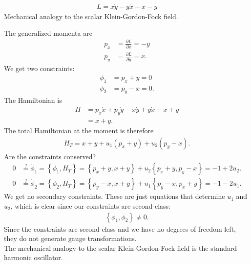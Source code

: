 \begin{exercise}
\begin{align*}
L = x \dot{y} - y \dot{x} - x - y
\end{align*}
Mechanical analogy to the scalar Klein-Gordon-Fock field.
\end{exercise}
\begin{solution}
The generalized momenta are
\begin{align*}
p_x &= \frac{\partial L}{\partial \dot{x}} = -y \\
p_y &= \frac{\partial L}{\partial \dot{y}} = x.
\end{align*}
We get two constraints:
\begin{align*}
\phi_1 &= p_x + y = 0 \\
\phi_2 &= p_y - x = 0.
\end{align*}
The Hamiltonian is
\begin{align*}
H &= p_x \dot{x} + p_y \dot{y} - x \dot{y} + y \dot{x} + x + y \\
&= x + y.
\end{align*}
The total Hamiltonian at the moment is therefore
\begin{align*}
H_T = x + y + u_1 (p_x + y) + u_2 (p_y - x).
\end{align*}
Are the constraints conserved?
\begin{align*}
0 &\overset{?}{=} \dot{\phi}_1 = \left \{ \phi_1,H_T \right \} = \left \{ p_x + y,x + y \right \} + u_2 \left \{ p_x + y,p_y - x \right \} = -1 + 2 u_2. \\
0 &\overset{?}{=} \dot{\phi}_2 = \left \{ \phi_2,H_T \right \} = \left \{ p_y - x,x + y \right \} + u_1 \left \{ p_y - x,p_x + y \right \} = -1 - 2 u_1.
\end{align*}
We get no secondary constraints. These are just equations that determine $u_1$ and $u_2$, which is clear since our constraints are second-class:
\begin{align*}
\left \{ \phi_1,\phi_2 \right \} \neq 0.
\end{align*}
Since the constraints are second-class and we have no degrees of freedom left, they do not generate gauge transformations. \\

The mechanical analogy to the scalar Klein-Gordon-Fock field is the standard harmonic oscillator.
\end{solution}





